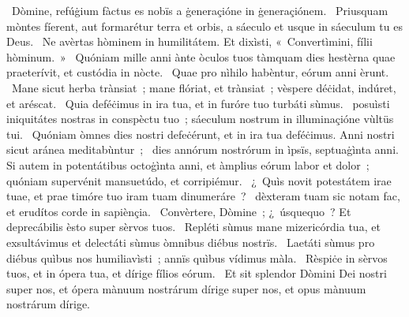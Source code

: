 ~Dòmine, refúġium fàctus es nobïs a ġeneraçióne in ġeneraçiónem. 
~Priusquam mòntes fíerent, aut formarétur terra et orbis, a sáeculo et usque in sáeculum tu es Deus. 
~Ne avèrtas hòminem in humilitátem. Et dixìsti, «~Convertìmini, fílii hòminum.~»
~Quóniam mille anni ànte òculos tuos tàmquam dies hestèrna quae praeterívit, et custódia in nòcte. 
~Quae pro nìhilo habèntur, eórum anni èrunt. 
~Mane sicut herba trànsiat~; mane flóriat, et trànsiat~; vèspere déċidat, indúret, et aréscat. 
~Quia deféċimus in ira tua, et in furóre tuo turbáti sùmus. 
~posuìsti iniquitátes nostras in conspèctu tuo~; sáeculum nostrum in illuminaçióne vùltüs tui. 
~Quóniam òmnes dies nostri defeċérunt, et in ira tua deféċimus. Anni nostri sicut aránea meditabùntur~; 
~dies annórum nostrórum in ìpsïs, septuaġìnta anni. Si autem in potentátibus octoġìnta anni, et àmplius eórum labor et dolor~; quóniam supervénit mansuetúdo, et corripiémur. 
~¿~Quìs novit potestátem irae tuae, et prae timóre tuo iram tuam dinumeráre~? 
~dèxteram tuam sic notam fac, et erudítos corde in sapiènçia. 
~Convèrtere, Dòmine~; ¿~úsquequo~? Et deprecábilis èsto super sèrvos tuos. 
~Repléti sùmus mane mizericórdia tua, et exsultávimus et delectáti sùmus òmnibus diébus nostrïs. 
~Laetáti sùmus pro diébus quìbus nos humiliavìsti~; annïs quìbus vídimus màla. 
~Rèspiċe in sèrvos tuos, et in ópera tua, et dírige fílios eórum. 
~Et sit splendor Dòmini Dei nostri super nos, et ópera mànuum nostrárum dírige super nos, et opus mànuum nostrárum dírige. 
